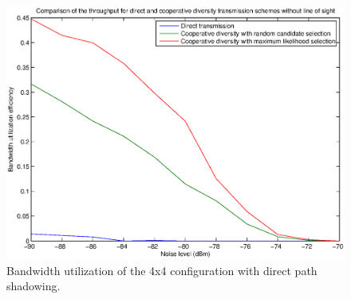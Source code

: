 \begin{figure}
\includegraphics[scale=.5]{figures/4x4throughput_shadowing}
\caption{Bandwidth utilization of the 4x4 configuration with direct path shadowing.}
\label{fig:4x4throughputshadowing}
\end{figure}